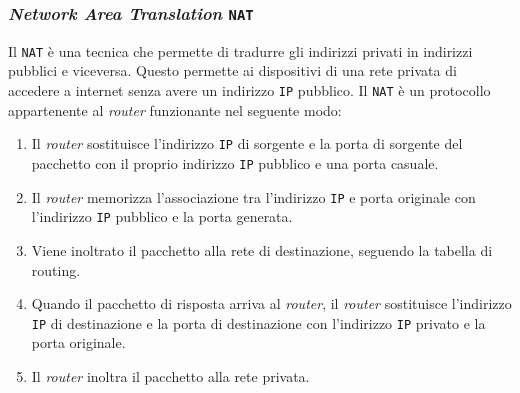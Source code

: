         \subsubsection{\textit{Network Area Translation} \texttt{NAT}}
            Il \texttt{NAT} è una tecnica che permette di tradurre gli indirizzi privati in indirizzi pubblici e viceversa. Questo permette ai dispositivi di una rete privata di accedere a internet senza avere un indirizzo \texttt{IP} pubblico. Il \texttt{NAT} è un protocollo appartenente al \textit{router} funzionante nel seguente modo:
            \begin{enumerate}
                \item Il \textit{router} sostituisce l'indirizzo \texttt{IP} di sorgente e la porta di sorgente del pacchetto con il proprio indirizzo \texttt{IP} pubblico e una porta casuale.
                \item Il \textit{router} memorizza l'associazione tra l'indirizzo \texttt{IP} e porta originale con l'indirizzo \texttt{IP} pubblico e la porta generata.
                \item Viene inoltrato il pacchetto alla rete di destinazione, seguendo la tabella di routing.
                \item Quando il pacchetto di risposta arriva al \textit{router}, il \textit{router} sostituisce l'indirizzo \texttt{IP} di destinazione e la porta di destinazione con l'indirizzo \texttt{IP} privato e la porta originale.
                \item Il \textit{router} inoltra il pacchetto alla rete privata.
            \end{enumerate}
